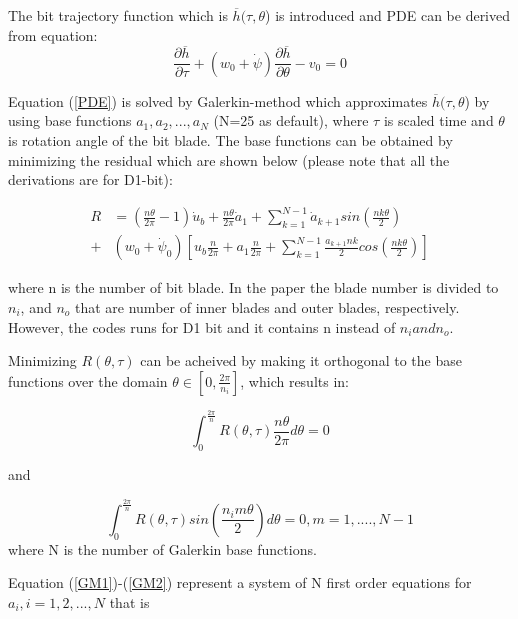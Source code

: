 The bit trajectory function which is $\overline{h}(\tau, \theta$) is introduced and PDE can be derived from equation:
\begin{equation}\label{PDE}
\frac{\partial \overline{h}}{\partial \tau} + (w_0 + \dot{\psi})\frac{\partial \overline{h}}{\partial \theta}-v_0 = 0
\end{equation}

Equation (\ref{PDE}) is solved by Galerkin-method which approximates $\overline{h}(\tau, \theta$) by using base functions $a_1, a_2, ..., a_N$ (N=25 as default), where $\tau$ is scaled time and $\theta$ is rotation angle of the bit blade. The base functions can be obtained by minimizing the residual which are shown below (please note that all the derivations are for D1-bit):

\begin{equation}\label{GM}
\begin{split}
R &= \left(\frac{n \theta}{2 \pi}-1\right)\dot{u}_b + \frac{n \theta}{2 \pi}\dot{a}_1 + \sum_{k=1}^{N-1}\dot{a}_{k+1}sin\left(\frac{nk\theta}{2}\right) \\ + &(w_0 + \dot{\psi}_0)\left[u_b\frac{n}{2\pi}+a_1\frac{n}{2\pi} + \sum_{k=1}^{N-1}\frac{a_{k+1}nk}{2}cos\left(\frac{nk\theta}{2}\right)\right]
\end{split}
\end{equation}

where n is the number of bit blade. In the paper the blade number is divided to $n_i$, and $n_o$ that are number of inner blades and outer blades, respectively. However, the codes runs for D1 bit and it contains n instead of $n_i and n_o$.

Minimizing $R(\theta, \tau)$ can be acheived by making it orthogonal to the base functions over the domain $\theta \in \left[0, \frac{2\pi}{n_i}\right]$, which results in:

\begin{equation}\label{GM1}
 \int_{0}^{\frac{2\pi}{n}}R(\theta,\tau)\frac{n\theta}{2\pi}d\theta = 0
\end{equation}

and

\begin{equation}\label{GM2}
 \int_{0}^{\frac{2\pi}{n}}R(\theta, \tau)sin\left(\frac{n_im\theta}{2}\right)d\theta=0, m= 1,....,N-1
\end{equation}
where N is the number of Galerkin base functions.

Equation (\ref{GM1})-(\ref{GM2}) represent a system of N first order equations for $a_i, i=1,2,...,N$ that is

